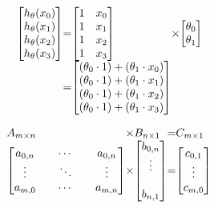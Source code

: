 \[
\begin{array}{ l@{} l@{} l@{} l@{} l@{} l@{}}
\begin{bmatrix}
	h_{\theta}(x_0) \\
	h_{\theta}(x_1) \\
	h_{\theta}(x_2) \\
	h_{\theta}(x_3) \\
\end{bmatrix}
& =
& \begin{bmatrix}
	1 & x_0 \\
	1 & x_1 \\
	1 & x_2 \\
	1 & x_3 \\
\end{bmatrix}
& \times
& \begin{bmatrix}
	\theta_0 \\
	\theta_1 \\
\end{bmatrix}
\\
& =
& \begin{bmatrix}
	( \theta_0 \cdot 1 ) + (\theta_1 \cdot x_0) \\
	( \theta_0 \cdot 1 ) + (\theta_1 \cdot x_1) \\
	( \theta_0 \cdot 1 ) + (\theta_1 \cdot x_2) \\
	( \theta_0 \cdot 1 ) + (\theta_1 \cdot x_3) \\
\end{bmatrix}

\\
\end{array}
\]

\[
\begin{array}{ l@{} l@{} l@{} l@{} l@{}}
A_{ m \times n }
& \times
& B_{ n \times 1}
& =
& C_{m \times 1} \\
\begin{bmatrix}
	a_{0,n} &  & \cdots & & a_{0,n} \\
	\vdots  &  & \ddots & & \vdots \\
	a_{m,0} &  & \cdots & & a_{m,n} \\
\end{bmatrix}
& \times
& \begin{bmatrix}
	b_{0,n} \\
	\vdots  \\
	\\
	b_{n,1} \\
\end{bmatrix}
& =
& \begin{bmatrix}
	c_{0,1} \\
	\vdots  \\
	c_{m,0} \\
\end{bmatrix}
\\
\end{array}
\]

